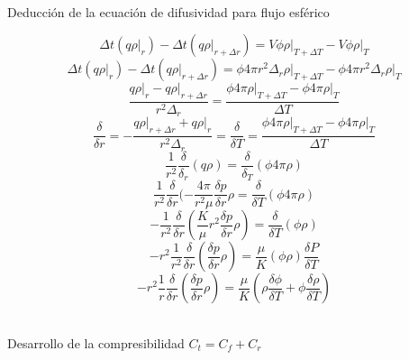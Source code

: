 \documentclass[10pt,a4paper]{report}
\begin{document}
\newpage
\
\begin{center}
Deducción de la ecuación de difusividad para flujo esférico
\end{center}
\bigskip
\begin{equation}
\Delta{t}(q\rho\vert_{r})-\Delta{t}(q\rho\vert_{r+\Delta{r}})= V\phi\rho\vert_{T+\Delta{T}}-V\phi\rho\vert_{T}
\end{equation}
\begin{equation}
\Delta{t}(q\rho\vert_{r})-\Delta{t}(q\rho\vert_{r+\Delta{r}})=\phi4\pi r^{2}\Delta_{r}\rho\vert_{T+\Delta{T}}-\phi4\pi r^{2}\Delta_{r}\rho\vert_{T}
\end{equation}
\begin{equation}
\frac{q\rho\vert_{r}-q\rho\vert_{r+\Delta{r}}}{r^{2}\Delta_{r}}=\frac{\phi4\pi\rho\vert_{T+\Delta{T}}-\phi4\pi\rho\vert_{T}}{\Delta{T}}
\end{equation}
\begin{equation}
\frac{\delta}{\delta{r}}=-\frac{q\rho\vert_{r+\Delta{r}}+q\rho\vert_{r}}{r^{2}\Delta_{r}}=\frac{\delta}{\delta{T}}=\frac{\phi4\pi\rho\vert_{T+\Delta{T}}-\phi4\pi\rho\vert_{T}}{\Delta{T}}
\end{equation}
\begin{equation}
\frac{1}{r^{2}}\frac{\delta}{\delta_{r}}(q\rho)=\frac{\delta}{\delta_{T}}(\phi4\pi\rho)
\end{equation}
\begin{equation}
\frac{1}{r^{2}}\frac{\delta}{\delta{r}}(-\frac{4\pi}{r^{2} \mu} \frac{\delta{p}}{\delta{r}}\rho = \frac{\delta}{\delta{T}}(\phi {4\pi}\rho)
\end{equation}
\begin{equation}
-\frac{1}{r^{2}}\frac{\delta}{\delta{r}}(\frac{K}{\mu} r^{2} \frac{\delta{p}}{\delta{r}}\rho)=\frac{\delta}{\delta{T}}(\phi\rho)
\end{equation}
\begin{equation}
-r^{2}\frac{1}{r^{2}}\frac{\delta}{\delta{r}}( \frac{\delta{p}}{\delta{r}}\rho)=\frac{\mu}{K}(\phi\rho)\frac{\delta{P}}{\delta{T}}
\end{equation}
\begin{equation}
-r^{2}\frac{1}{r}\frac{\delta}{\delta{r}}( \frac{\delta{p}}{\delta{r}}\rho)=\frac{\mu}{K}(\rho\frac{\delta{\phi}}{\delta{T}}+ \phi \frac{\delta{\rho}}{\delta{T}})
\end{equation}
\\
\begin{normalsize}
Desarrollo de la compresibilidad  $C_{t}=C_{f}+C_{r}$
\end{normalsize}
\end{document}
